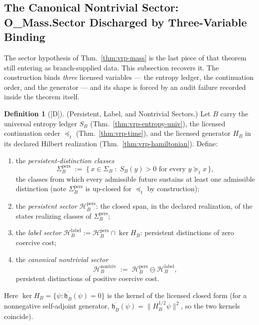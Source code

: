 \documentclass[12pt,oneside]{amsbook}
\theoremstyle{plain}
\theoremstyle{definition}
\newtheorem{definition}[theorem]{Definition}
\theoremstyle{remark}
\newcommand{\status}[1]{\textup{[#1]}}
\begin{document}
\subsection{The Canonical Nontrivial Sector: O\_Mass.Sector
Discharged by Three-Variable Binding}
\label{sec:vrp-mass-sector}

The sector hypothesis of Thm.~\ref{thm:vrp-mass} is the last piece
of that theorem still entering as branch-supplied data.  This
subsection recovers it.  The construction binds \emph{three}
licensed variables --- the entropy ledger, the continuation order,
and the generator --- and its shape is forced by an audit failure
recorded inside the theorem itself.

\begin{definition}[\status{D}]\label{def:vrp-nontrivial-sector}
\textup{(Persistent, Label, and Nontrivial Sectors.)}
Let $B$ carry the universal entropy ledger $S_B$
(Thm.~\ref{thm:vrp-entropy-univ}), the licensed continuation order
$\preceq_t$ (Thm.~\ref{thm:vrp-time}), and the licensed generator
$H_B$ in its declared Hilbert realization
(Thm.~\ref{thm:vrp-hamiltonian}).  Define:
\begin{enumerate}[label=\textup{(\roman*)}]
  \item the \emph{persistent-distinction classes}
    \[
      \Sigma_B^{\mathrm{pers}} \;:=\;
      \{\, x \in \Sigma_B \;:\; S_B(y) > 0
      \text{ for every } y \succeq_t x \,\},
    \]
    the classes from which every admissible future sustains at
    least one admissible distinction (note
    $\Sigma_B^{\mathrm{pers}}$ is up-closed for $\preceq_t$ by
    construction);
  \item the \emph{persistent sector}
    $\mathcal{H}_B^{\mathrm{pers}}$: the closed span, in the
    declared realization, of the states realizing classes of
    $\Sigma_B^{\mathrm{pers}}$;
  \item the \emph{label sector}
    $\mathcal{H}_B^{\mathrm{label}} :=
    \mathcal{H}_B^{\mathrm{pers}} \cap \ker H_B$: persistent
    distinctions of zero coercive cost;
  \item the \emph{canonical nontrivial sector}
    \[
      \mathcal{H}_B^{\mathrm{nontriv}} \;:=\;
      \mathcal{H}_B^{\mathrm{pers}} \ominus
      \mathcal{H}_B^{\mathrm{label}},
    \]
    persistent distinctions of positive coercive cost.
\end{enumerate}
Here $\ker H_B = \{\psi : \overline{\mathfrak{h}_B}(\psi) = 0\}$
is the kernel of the licensed closed form (for a nonnegative
self-adjoint generator, $\overline{\mathfrak{h}_B}(\psi) =
\|H_B^{1/2}\psi\|^2$, so the two kernels coincide).
\end{definition}
\end{document}
